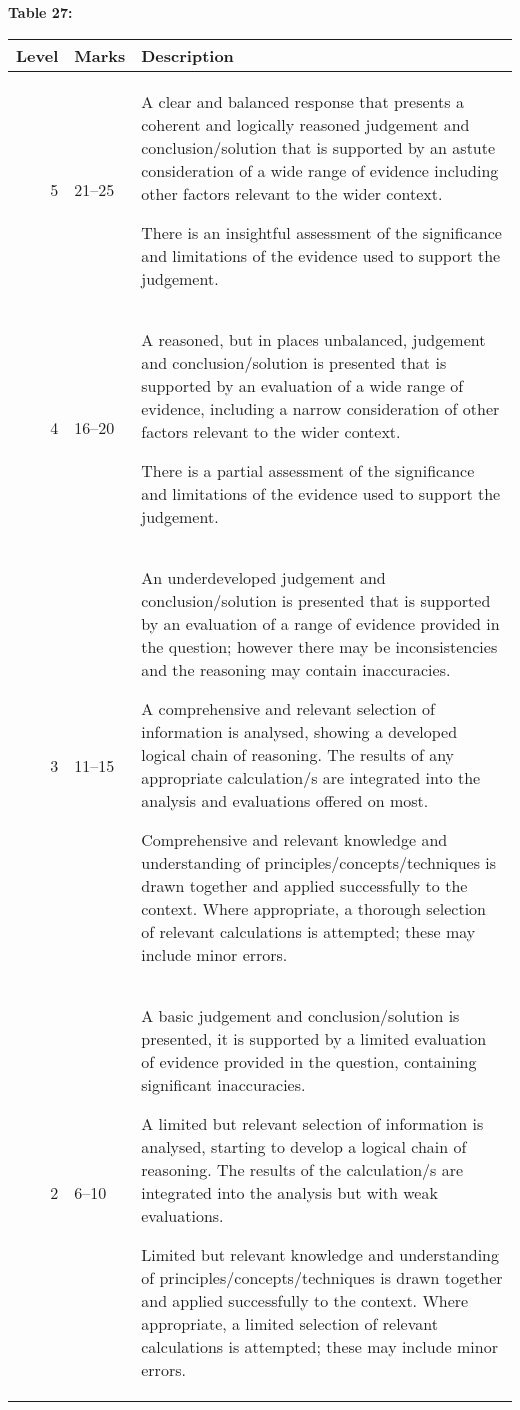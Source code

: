 \documentclass{article}
\begin{document}
\textbf{Table 27:}
\begin{tabular}{rll}
\toprule
Level & Marks & Description \\
\midrule
5 & 21–25 & A clear and balanced response that presents a coherent and logically reasoned
judgement and conclusion/solution that is supported by an astute consideration of a
wide range of evidence including other factors relevant to the wider context.

There is an insightful assessment of the significance and limitations of the evidence
used to support the judgement. \\
4 & 16–20 & A reasoned, but in places unbalanced, judgement and conclusion/solution is
presented that is supported by an evaluation of a wide range of evidence, including a
narrow consideration of other factors relevant to the wider context.

There is a partial assessment of the significance and limitations of the evidence used
to support the judgement. \\
3 & 11–15 & An underdeveloped judgement and conclusion/solution is presented that is
supported by an evaluation of a range of evidence provided in the question; however
there may be inconsistencies and the reasoning may contain inaccuracies.

A comprehensive and relevant selection of information is analysed, showing a
developed logical chain of reasoning.  The results of any appropriate calculation/s
are integrated into the analysis and evaluations offered on most.

Comprehensive and relevant knowledge and understanding of
principles/concepts/techniques is drawn together and applied successfully to the
context.  Where appropriate, a thorough selection of relevant calculations is
attempted; these may include minor errors. \\
2 & 6–10 & A basic judgement and conclusion/solution is presented, it is supported by a limited
evaluation of evidence provided in the question, containing significant inaccuracies.

A limited but relevant selection of information is analysed, starting to develop a
logical chain of reasoning.  The results of the calculation/s are integrated into the
analysis but with weak evaluations.

Limited but relevant knowledge and understanding of principles/concepts/techniques
is drawn together and applied successfully to the context.  Where appropriate, a
limited selection of relevant calculations is attempted; these may include minor
errors. \\
\bottomrule
\end{tabular}
\end{document}
